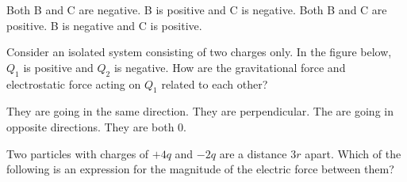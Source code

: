 \documentclass[answers]{exam}
\begin{document}
\begin{questions}
\begin{center}
\hspace{1cm}
\end{center}

\begin{randomizechoices}
    \correctchoice Both B and C are negative.
    \choice B is positive and C is negative.
    \choice Both B and C are positive.
    \choice B is negative and C is positive.
\end{randomizechoices}

\question
Consider an isolated system consisting of two charges only. In the figure below, $Q_1$ is positive and $Q_2$ is negative.  How are the gravitational force and electrostatic force acting on $Q_1$ related to each other?

\begin{minipage}{9cm}
\begin{randomizechoices}
    \correctchoice They are going in the same direction.
    \choice They are perpendicular.
    \choice The are going in opposite directions.
    \choice They are both 0.
\end{randomizechoices}
\end{minipage}
%
\begin{minipage}{3cm}
\centering
{}    
\end{minipage}




\question
Two particles with charges of $+4q$ and $-2q$ are a distance $3r$ apart. Which of the following is an expression for the magnitude of the electric force between them?


\end{questions}
\end{document}
